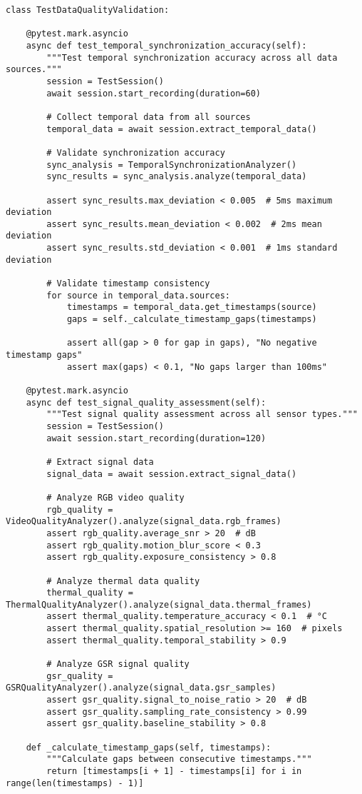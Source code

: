 \documentclass[11pt,a4paper]{report}
\begin{document}
\begin{verbatim}
class TestDataQualityValidation:

    @pytest.mark.asyncio
    async def test_temporal_synchronization_accuracy(self):
        """Test temporal synchronization accuracy across all data sources."""
        session = TestSession()
        await session.start_recording(duration=60)

        # Collect temporal data from all sources
        temporal_data = await session.extract_temporal_data()

        # Validate synchronization accuracy
        sync_analysis = TemporalSynchronizationAnalyzer()
        sync_results = sync_analysis.analyze(temporal_data)

        assert sync_results.max_deviation < 0.005  # 5ms maximum deviation
        assert sync_results.mean_deviation < 0.002  # 2ms mean deviation
        assert sync_results.std_deviation < 0.001  # 1ms standard deviation

        # Validate timestamp consistency
        for source in temporal_data.sources:
            timestamps = temporal_data.get_timestamps(source)
            gaps = self._calculate_timestamp_gaps(timestamps)

            assert all(gap > 0 for gap in gaps), "No negative timestamp gaps"
            assert max(gaps) < 0.1, "No gaps larger than 100ms"

    @pytest.mark.asyncio
    async def test_signal_quality_assessment(self):
        """Test signal quality assessment across all sensor types."""
        session = TestSession()
        await session.start_recording(duration=120)

        # Extract signal data
        signal_data = await session.extract_signal_data()

        # Analyze RGB video quality
        rgb_quality = VideoQualityAnalyzer().analyze(signal_data.rgb_frames)
        assert rgb_quality.average_snr > 20  # dB
        assert rgb_quality.motion_blur_score < 0.3
        assert rgb_quality.exposure_consistency > 0.8

        # Analyze thermal data quality
        thermal_quality = ThermalQualityAnalyzer().analyze(signal_data.thermal_frames)
        assert thermal_quality.temperature_accuracy < 0.1  # °C
        assert thermal_quality.spatial_resolution >= 160  # pixels
        assert thermal_quality.temporal_stability > 0.9

        # Analyze GSR signal quality
        gsr_quality = GSRQualityAnalyzer().analyze(signal_data.gsr_samples)
        assert gsr_quality.signal_to_noise_ratio > 20  # dB
        assert gsr_quality.sampling_rate_consistency > 0.99
        assert gsr_quality.baseline_stability > 0.8

    def _calculate_timestamp_gaps(self, timestamps):
        """Calculate gaps between consecutive timestamps."""
        return [timestamps[i + 1] - timestamps[i] for i in range(len(timestamps) - 1)]
\end{verbatim}
\end{document}
